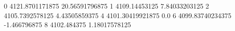 0 4121.8701171875 20.56591796875
1 4109.14453125 7.84033203125
2 4105.7392578125 4.43505859375
4 4101.30419921875 0.0
6 4099.83740234375 -1.466796875
8 4102.484375 1.18017578125

